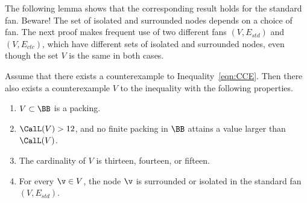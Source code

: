 The following lemma shows that the corresponding result holds for the
standard fan.  Beware!  The set of isolated and surrounded
nodes depends on a choice of fan.  The next proof makes frequent use
of two different fans $(V,E_{std})$ and $(V,E_{ctc})$, which have
different sets of isolated and surrounded nodes, even though the
set $V$ is the same in both cases.



\begin{lemma}[] %
\label{lemma:surrounded}  %
  Assume that there exists a counterexample to
  Inequality~\ref{eqn:CCE}.  Then there also exists a counterexample
  $V$ to the inequality with the following properties.
\begin{enumerate}\wasitemize 
\item $V\subset \BB$ is a packing.
\item $\CalL(V) > 12$, and no finite packing in $\BB$ attains a value
  larger than $\CalL(V)$.
\item The cardinality of $V$ is thirteen, fourteen, or fifteen.
\item For every  $\v\in V$, the node $\v$ is surrounded or isolated
in the standard fan $(V,E_{std})$.
\end{enumerate}\wasitemize 
\end{lemma}


